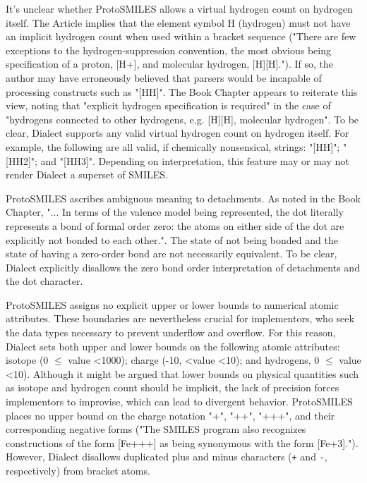 \documentclass{article}
\def\ttt{\texttt}
\begin{document}
It's unclear whether ProtoSMILES allows a virtual hydrogen count on hydrogen itself. The Article implies that the element symbol H (hydrogen) must not have an implicit hydrogen count when used within a bracket sequence ("There are few exceptions to the hydrogen-suppression convention, the most obvious being specification of a proton, [H+], and molecular hydrogen, [H][H].").\cite[p. 34]{weininger:1988} If so, the author may have erroneously believed that parsers would be incapable of processing constructs such as "[HH]". The Book Chapter appears to reiterate this view, noting that "explicit hydrogen specification is required" in the case of "hydrogens connected to other hydrogens, e.g. [H][H], molecular hydrogen".\cite[p 97]{weininger:2008} To be clear, Dialect supports any valid virtual hydrogen count on hydrogen itself. For example, the following are all valid, if chemically nonsensical, strings: "[HH]"; "[HH2]"; and "[HH3]". Depending on interpretation, this feature may or may not render Dialect a superset of SMILES.

ProtoSMILES ascribes ambiguous meaning to detachments. As noted in the Book Chapter, "... In terms of the valence model being represented, the dot literally represents a bond of formal order zero: the atoms on either side of the dot are explicitly not bonded to each other.".\cite[p 88]{weininger:2008} The state of not being bonded and the state of having a zero-order bond are not necessarily equivalent.\cite{clark:2011} To be clear, Dialect explicitly disallows the zero bond order interpretation of detachments and the dot character.

ProtoSMILES assigns no explicit upper or lower bounds to numerical atomic attributes. These boundaries are nevertheless crucial for implementors, who seek the data types necessary to prevent underflow and overflow. For this reason, Dialect sets both upper and lower bounds on the following atomic attributes: isotope (0 $\leq$ value \textless 1000); charge (-10, \textless value \textless 10); and hydrogens, 0 $\leq$ value \textless 10). Although it might be argued that lower bounds on physical quantities such as isotope and hydrogen count should be implicit, the lack of precision forces implementors to improvise, which can lead to divergent behavior. ProtoSMILES places no upper bound on the charge notation "+", "++", "+++", and their corresponding negative forms ("The SMILES program also recognizes constructions of the form [Fe+++] as being synonymous with the form [Fe+3].").\cite[p 32]{weininger:1988} However, Dialect disallows duplicated plus and minus characters (\ttt{+} and \ttt{-}, respectively) from bracket atoms.
\end{document}
